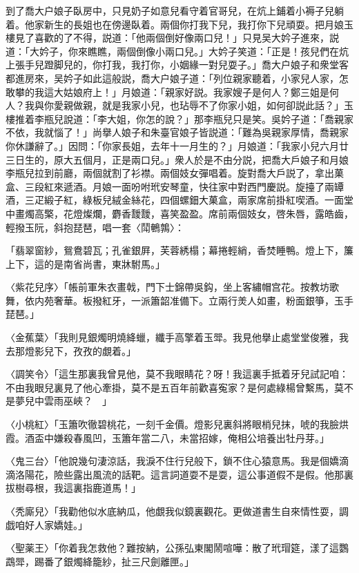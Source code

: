 到了喬大户娘子臥房中，只見奶子如意兒看守着官哥兒，在炕上鋪着小褥子兒躺着。他家新生的長姐也在傍邊臥着。兩個你打我下兒，我打你下兒頑耍。把月娘玉樓見了喜歡的了不得，説道：「他兩個倒好像兩口兒！」只見吴大妗子進來，説道：「大妗子，你來瞧瞧，兩個倒像小兩口兒。」大妗子笑道：「正是！孩兒們在炕上張手兒蹬脚兒的，你打我，我打你，小姻緣一對兒耍子。」喬大户娘子和衆堂客都進房來，吴妗子如此這般説，喬大户娘子道：「列位親家聽着，小家兒人家，怎敢攀的我這大姑娘府上！」月娘道：「親家好説。我家嫂子是何人？鄭三姐是何人？我與你愛親做親，就是我家小兒，也玷辱不了你家小姐，如何卻説此話？」玉樓推着李瓶兒說道：「李大姐，你怎的說？」那李瓶兒只是笑。吳妗子道：「喬親家不依，我就惱了！」尚擧人娘子和朱臺官娘子皆説道：「難為吳親家厚情，喬親家你休謙辭了。」因問：「你家長姐，去年十一月生的？」月娘道：「我家小兒六月廿三日生的，原大五個月，正是兩口兒。」衆人於是不由分説，把喬大戶娘子和月娘李瓶兒拉到前廳，兩個就割了衫襟。兩個妓女彈唱着。旋對喬大戶説了，拿出菓盒、三段紅來遞酒。月娘一面吩咐玳安琴童，快往家中對西門慶説。旋擡了兩罈酒，三疋緞子紅，綠板兒絨金絲花，四個螺鈿大菓盒，兩家席前掛紅喫酒。一面堂中畫燭高檠，花燈燦爛，麝香靉靉，喜笑盈盈。席前兩個妓女，啓朱唇，露皓齒，輕撥玉阮，斜抱琵琶，唱一套〈鬦鵪鶉〉：

「翡翠窗紗，鴛鴦碧瓦；孔雀銀屛，芙蓉綉榻；幕捲輕綃，香焚睡鴨。燈上下，簾上下，這的是南省尚書，東牀駙馬。」

〈紫花兒序〉「帳前軍朱衣畫戟，門下士錦帶吳鈎，坐上客繡帽宫花。按教坊歌舞，依内苑奢華。板撥紅牙，一派簫韶准備下。立兩行羙人如畫，粉面銀箏，玉手琵琶。」

〈金蕉葉〉「我則見銀燭明燒絳蠟，纖手高擎着玉斝。我見他擧止處堂堂俊雅，我去那燈影兒下，孜孜的覷着。」

〈調笑令〉「這生那裏我曾見他，莫不我眼睛花？呀！我這裏手抵着牙兒試記咱：不由我眼兒裏見了他心牽掛，莫不是五百年前歡喜寃家？是何處綠楊曾繫馬，莫不是夢兒中雲雨巫峽？　」

〈小桃紅〉「玉簫吹徹碧桃花，一刻千金價。燈影兒裏斜將眼梢兒抹，唬的我臉烘霞。酒盃中嫌殺春風凹，玉簫年當二八，未當招嫁，俺相公培養出牡丹芽。」

〈鬼三台〉「他說幾句淒涼話，我淚不住行兒般下，鎖不住心猿意馬。我是個嬌滴滴洛陽花，險些露出風流的話靶。這言詞道耍不是耍，這公事道假不是假。他那裏拔樹尋根，我這裏指鹿道馬！」

〈秃廝兒〉「我勸他似水底納瓜，他覷我似鏡裏觀花。更做道書生自來情性耍，調戯咱好人家嬌娃。」

〈聖薬王〉「你着我怎救他？難按納，公孫弘東閣鬧喧嘩：散了玳瑁筵，漾了這鸚鵡斝，踢番了銀燭絳籠紗，扯三尺劍離匣。」

